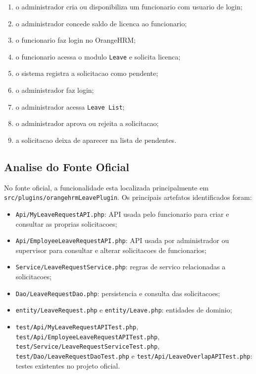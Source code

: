 \begin{enumerate}
    \item o administrador cria ou disponibiliza um funcionario com usuario de login;
    \item o administrador concede saldo de licenca ao funcionario;
    \item o funcionario faz login no OrangeHRM;
    \item o funcionario acessa o modulo \texttt{Leave} e solicita licenca;
    \item o sistema registra a solicitacao como pendente;
    \item o administrador faz login;
    \item o administrador acessa \texttt{Leave List};
    \item o administrador aprova ou rejeita a solicitacao;
    \item a solicitacao deixa de aparecer na lista de pendentes.
\end{enumerate}

\subsection{Analise do Fonte Oficial}
No fonte oficial, a funcionalidade esta localizada principalmente em \texttt{src/plugins/orangehrmLeavePlugin}. Os principais artefatos identificados foram:

\begin{itemize}
    \item \texttt{Api/MyLeaveRequestAPI.php}: API usada pelo funcionario para criar e consultar as proprias solicitacoes;
    \item \texttt{Api/EmployeeLeaveRequestAPI.php}: API usada por administrador ou supervisor para consultar e alterar solicitacoes de funcionarios;
    \item \texttt{Service/LeaveRequestService.php}: regras de servico relacionadas a solicitacoes;
    \item \texttt{Dao/LeaveRequestDao.php}: persistencia e consulta das solicitacoes;
    \item \texttt{entity/LeaveRequest.php} e \texttt{entity/Leave.php}: entidades de dominio;
    \item \texttt{test/Api/MyLeaveRequestAPITest.php}, \texttt{test/Api/EmployeeLeaveRequestAPITest.php}, \texttt{test/Service/LeaveRequestServiceTest.php}, \texttt{test/Dao/LeaveRequestDaoTest.php} e \texttt{test/Api/LeaveOverlapAPITest.php}: testes existentes no projeto oficial.
\end{itemize}

